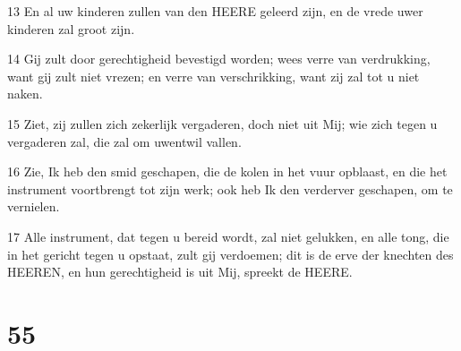 \par 13 En al uw kinderen zullen van den HEERE geleerd zijn, en de vrede uwer kinderen zal groot zijn.
\par 14 Gij zult door gerechtigheid bevestigd worden; wees verre van verdrukking, want gij zult niet vrezen; en verre van verschrikking, want zij zal tot u niet naken.
\par 15 Ziet, zij zullen zich zekerlijk vergaderen, doch niet uit Mij; wie zich tegen u vergaderen zal, die zal om uwentwil vallen.
\par 16 Zie, Ik heb den smid geschapen, die de kolen in het vuur opblaast, en die het instrument voortbrengt tot zijn werk; ook heb Ik den verderver geschapen, om te vernielen.
\par 17 Alle instrument, dat tegen u bereid wordt, zal niet gelukken, en alle tong, die in het gericht tegen u opstaat, zult gij verdoemen; dit is de erve der knechten des HEEREN, en hun gerechtigheid is uit Mij, spreekt de HEERE.

\chapter{55}

